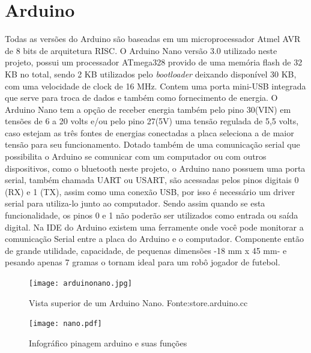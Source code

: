\documentclass[a4paper,12pt,portuguese]{ufms-cpcx}
\begin{document}
\section{Arduino}\label{arduinonano}
Todas as versões do Arduino são baseadas em um microprocessador Atmel AVR de 8 bits de arquitetura RISC\cite{arduinoemacao}. O Arduino Nano versão 3.0 utilizado neste projeto, possui um processador ATmega328 provido de uma memória flash de 32 KB no total, sendo 2 KB utilizados pelo \textit{bootloader} deixando disponível 30 KB, com uma velocidade de clock de 16 MHz. Contem uma porta mini-USB integrada que serve para troca de dados e também como fornecimento de energia. O Arduino Nano tem a opção de receber energia também pelo pino 30(VIN) em tensões de 6 a 20 volts e/ou pelo pino 27(5V) uma tensão regulada de 5,5 volts, caso estejam as três fontes de energias conectadas a placa seleciona a de maior tensão para seu funcionamento. Dotado também de uma comunicação serial que possibilita o Arduino se comunicar com um computador ou com outros dispositivos, como o bluetooth neste projeto, o Arduino nano possuem uma porta serial, também chamada UART ou USART, são acessadas pelos pinos digitais 0 (RX) e 1 (TX), assim como uma conexão USB, por isso é necessário um driver serial para utiliza-lo junto ao computador. Sendo assim quando se esta funcionalidade, os pinos 0 e 1 não poderão ser utilizados como entrada ou saída digital.
Na IDE do Arduino existem uma ferramente onde você pode monitorar a comunicação Serial entre a placa do Arduino e o computador.
Componente então de grande utilidade, capacidade, de pequenas dimensões -18 mm x 45 mm- e pesando apenas 7 gramas o tornam ideal para um robô jogador de futebol. 
\begin{figure}[H]
	\centering
	\texttt{[image: arduinonano.jpg]}
	\caption{Vista superior de um Arduino Nano. Fonte:store.arduino.cc}
\end{figure}
\begin{figure}[H]
	\centering
	\texttt{[image: nano.pdf]}
	\caption{Infográfico pinagem arduino e suas funções}
\end{figure}
\end{document}
